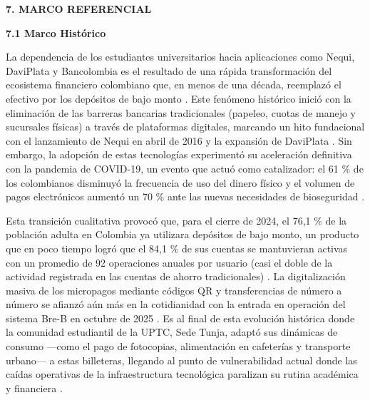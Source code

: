 \begin{center}
    {\Large\bfseries 7. MARCO REFERENCIAL}
\end{center}

\noindent\textbf{\large 7.1 Marco Histórico}\par\vspace{0.2cm}
La dependencia de los estudiantes universitarios hacia aplicaciones como Nequi, DaviPlata y Bancolombia es el resultado de una rápida transformación del ecosistema financiero colombiano que, en menos de una década, reemplazó el efectivo por los depósitos de bajo monto \cite{unisalle2026}. Este fenómeno histórico inició con la eliminación de las barreras bancarias tradicionales (papeleo, cuotas de manejo y sucursales físicas) a través de plataformas digitales, marcando un hito fundacional con el lanzamiento de Nequi en abril de 2016 y la expansión de DaviPlata \cite{unisalle2026}. Sin embargo, la adopción de estas tecnologías experimentó su aceleración definitiva con la pandemia de COVID-19, un evento que actuó como catalizador: el 61 \% de los colombianos disminuyó la frecuencia de uso del dinero físico y el volumen de pagos electrónicos aumentó un 70 \% ante las nuevas necesidades de bioseguridad \cite{cajamarca2021}.

Esta transición cualitativa provocó que, para el cierre de 2024, el 76,1 \% de la población adulta en Colombia ya utilizara depósitos de bajo monto, un producto que en poco tiempo logró que el 84,1 \% de sus cuentas se mantuvieran activas con un promedio de 92 operaciones anuales por usuario (casi el doble de la actividad registrada en las cuentas de ahorro tradicionales) \cite{unisalle2026}. La digitalización masiva de los micropagos mediante códigos QR y transferencias de número a número se afianzó aún más en la cotidianidad con la entrada en operación del sistema Bre-B en octubre de 2025 \cite{unisalle2026}. Es al final de esta evolución histórica donde la comunidad estudiantil de la UPTC, Sede Tunja, adaptó sus dinámicas de consumo —como el pago de fotocopias, alimentación en cafeterías y transporte urbano— a estas billeteras, llegando al punto de vulnerabilidad actual donde las caídas operativas de la infraestructura tecnológica paralizan su rutina académica y financiera \cite{restrepo2023habitos, martinez2023retos, pulido2024caracteristicas}.

